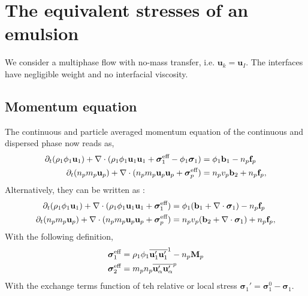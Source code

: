 \section{The equivalent stresses of an emulsion}

We consider a multiphase flow with no-mass transfer, i.e. $\textbf{u}_k=\textbf{u}_I$.
The interfaces have negligible weight and no interfacial viscosity. 

\subsection{Momentum equation}
The  continuous and particle averaged momentum equation of the continuous and dispersed phase now reads as, 
\begin{align*}
    \partial_t (\rho_1\phi_1 \textbf{u}_1 )
    + \mathbf{\nabla} \cdot (\rho_1\phi_1 \textbf{u}_1  \textbf{u}_1
    + \bm{\sigma}^\text{eff}_1 
    - \phi_1 \bm{\sigma}_1)
    &= 
    \phi_1 \textbf{b}_1
    - n_p \textbf{f}_p \\
    \partial_t (n_p m_p \textbf{u}_p)
    + \mathbf{\nabla} \cdot (
        n_p m_p \textbf{u}_p\textbf{u}_p
        + \bm{\sigma}^\text{eff}_p
        )
    &= 
     n_p v_p 
      \textbf{b}_2
    + n_p \textbf{f}_p ,
\end{align*}
Alternatively, they can be written as :
\begin{align*}
    \partial_t (\rho_1\phi_1 \textbf{u}_1 )
    + \mathbf{\nabla} \cdot (\rho_1\phi_1 \textbf{u}_1  \textbf{u}_1
    + \bm{\sigma}^\text{eff}_1 )
    &= 
    \phi_1( \textbf{b}_1  +\mathbf{\nabla} \cdot  \bm{\sigma}_1)
    - n_p \textbf{f}_p \\
    \partial_t (n_p m_p \textbf{u}_p)
    + \mathbf{\nabla} \cdot (
        n_p m_p \textbf{u}_p\textbf{u}_p
        + \bm{\sigma}^\text{eff}_p
        )
    &= 
     n_p v_p (
      \textbf{b}_2
    + \mathbf{\nabla} \cdot \bm{\sigma}_1 )
    + n_p \textbf{f}_p ,
\end{align*}
With the following definition, 
\begin{align*}
    \bm{\sigma}^\text{eff}_1
    &=\rho_1 \phi_1 \overline{\textbf{u}_1'\textbf{u}_1'}^1
    - n_p \textbf{M}_p 
    \\
    \bm{\sigma}^\text{eff}_2
    &= m_p n_p\overline{ \textbf{u}_\alpha'\textbf{u}_\alpha'}^{p} 
\end{align*}
With the exchange terms function of teh relative or local stress $\bm{\sigma}_1'=\bm{\sigma}_1^0 - \bm{\sigma}_1$. 

